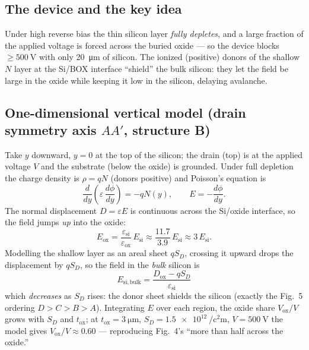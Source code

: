 \documentclass[11pt]{article}
\newcommand{\eox}{\varepsilon_{\mathrm{ox}}}
\newcommand{\esi}{\varepsilon_{\mathrm{si}}}
\newcommand{\SD}{S_{D}}
\newcommand{\tox}{t_{\mathrm{ox}}}
\begin{document}
\subsection{The device and the key idea}
Under high reverse bias the thin silicon layer \emph{fully depletes}, and a large
fraction of the applied voltage is forced across the buried oxide --- so the
device blocks $\ge \SI{500}{\volt}$ with only \SI{20}{\micro\meter} of silicon.
The ionized (positive) donors of the shallow $N$ layer at the Si/BOX interface
``shield'' the bulk silicon: they let the field be large in the oxide while
keeping it low in the silicon, delaying avalanche.

\subsection{One-dimensional vertical model (drain symmetry axis $AA'$, structure B)}
Take $y$ downward, $y=0$ at the top of the silicon; the drain (top) is at the
applied voltage $V$ and the substrate (below the oxide) is grounded. Under full
depletion the charge density is $\rho = qN$ (donors positive) and Poisson's
equation is
\begin{equation}
\frac{d}{dy}\!\left(\varepsilon\,\frac{d\phi}{dy}\right) = -qN(y),
\qquad E = -\frac{d\phi}{dy}.
\end{equation}
The normal displacement $D=\varepsilon E$ is continuous across the Si/oxide
interface, so the field jumps \emph{up} into the oxide:
\begin{equation}
E_{\mathrm{ox}} = \frac{\esi}{\eox}\,E_{\mathrm{si}}
\approx \frac{11.7}{3.9}\,E_{\mathrm{si}} \approx 3\,E_{\mathrm{si}}.
\end{equation}
Modelling the shallow layer as an areal sheet $q\SD$, crossing it upward drops the
displacement by $q\SD$, so the field in the \emph{bulk} silicon is
\begin{equation}
\boxed{\,E_{\mathrm{si,bulk}} = \frac{D_{\mathrm{ox}} - q\SD}{\esi}\,}
\end{equation}
which \emph{decreases} as $\SD$ rises: the donor sheet shields the silicon (exactly
the Fig.~5 ordering $D>C>B>A$). Integrating $E$ over each region, the oxide share
$V_{\mathrm{ox}}/V$ grows with $\SD$ and $\tox$; at $\tox=\SI{3}{\micro\meter}$,
$\SD=\SI{1.5e12}{\per\square\centi\meter}$, $V=\SI{500}{\volt}$ the model gives
$V_{\mathrm{ox}}/V\approx0.60$ --- reproducing Fig.~4's ``more than half across
the oxide.''
\end{document}
